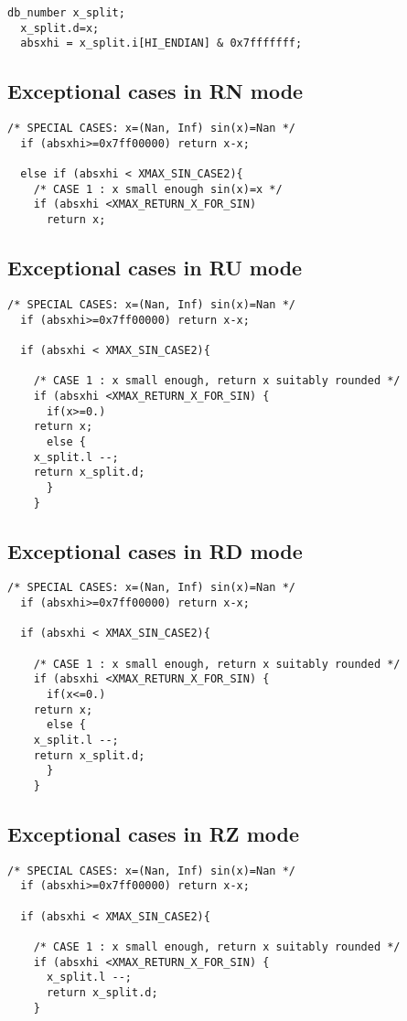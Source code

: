 \begin{lstlisting}[caption={Casting to an int for faster comparisons},firstnumber=1]
  db_number x_split;
  x_split.d=x;
  absxhi = x_split.i[HI_ENDIAN] & 0x7fffffff;
\end{lstlisting}


\subsection{Exceptional cases in RN mode}
\begin{lstlisting}[caption={Exceptional cases for sine RN},firstnumber=1]
  /* SPECIAL CASES: x=(Nan, Inf) sin(x)=Nan */
  if (absxhi>=0x7ff00000) return x-x;    
   
  else if (absxhi < XMAX_SIN_CASE2){
    /* CASE 1 : x small enough sin(x)=x */
    if (absxhi <XMAX_RETURN_X_FOR_SIN)
      return x;
\end{lstlisting}

\subsection{Exceptional cases in RU mode}
\begin{lstlisting}[caption={Exceptional cases for sine RU},firstnumber=1]
  /* SPECIAL CASES: x=(Nan, Inf) sin(x)=Nan */
  if (absxhi>=0x7ff00000) return x-x;    
  
  if (absxhi < XMAX_SIN_CASE2){

    /* CASE 1 : x small enough, return x suitably rounded */
    if (absxhi <XMAX_RETURN_X_FOR_SIN) {
      if(x>=0.)
	return x;
      else {
	x_split.l --;
	return x_split.d;
      }
    }
\end{lstlisting}
\subsection{Exceptional cases in RD mode}
\begin{lstlisting}[caption={Exceptional cases for sine RD},firstnumber=1]
  /* SPECIAL CASES: x=(Nan, Inf) sin(x)=Nan */
  if (absxhi>=0x7ff00000) return x-x;    
  
  if (absxhi < XMAX_SIN_CASE2){

    /* CASE 1 : x small enough, return x suitably rounded */
    if (absxhi <XMAX_RETURN_X_FOR_SIN) {
      if(x<=0.)
	return x;
      else {
	x_split.l --;
	return x_split.d;
      }
    }
\end{lstlisting}
\subsection{Exceptional cases in RZ mode}
\begin{lstlisting}[caption={Exceptional cases for sine RZ},firstnumber=1]
  /* SPECIAL CASES: x=(Nan, Inf) sin(x)=Nan */
  if (absxhi>=0x7ff00000) return x-x;    
  
  if (absxhi < XMAX_SIN_CASE2){

    /* CASE 1 : x small enough, return x suitably rounded */
    if (absxhi <XMAX_RETURN_X_FOR_SIN) {
      x_split.l --;
      return x_split.d;
    }
\end{lstlisting}
